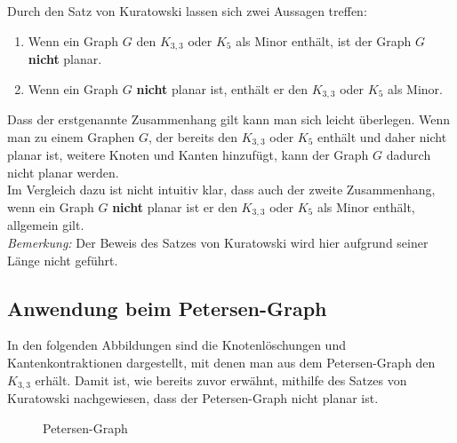 \documentclass[a4paper]{article}
\begin{document}
Durch den Satz von Kuratowski lassen sich zwei Aussagen treffen:

\begin{enumerate}
    \item Wenn ein Graph $G$ den $K_{3,3}$ oder $K_5$ als Minor enthält, ist der Graph $G$ \textbf{nicht} planar.
    \item Wenn ein Graph $G$ \textbf{nicht} planar ist, enthält er den $K_{3,3}$ oder $K_5$ als Minor.
\end{enumerate}

Dass der erstgenannte Zusammenhang gilt kann man sich leicht überlegen.
Wenn man zu einem Graphen $G$, der bereits den $K_{3,3}$ oder $K_5$ enthält und daher nicht planar ist, weitere Knoten und Kanten hinzufügt, kann der Graph $G$ dadurch nicht planar werden.\\

Im Vergleich dazu ist nicht intuitiv klar, dass auch der zweite Zusammenhang, wenn ein Graph $G$ \textbf{nicht} planar ist er den $K_{3,3}$ oder $K_5$ als Minor enthält, allgemein gilt.\\

\textit{Bemerkung:} Der Beweis des Satzes von Kuratowski wird hier aufgrund seiner Länge nicht geführt.


\subsection{Anwendung beim Petersen-Graph}
In den folgenden Abbildungen sind die Knotenlöschungen und Kantenkontraktionen dargestellt, mit denen man aus dem Petersen-Graph den $K_{3,3}$ erhält.
Damit ist, wie bereits zuvor erwähnt, mithilfe des Satzes von Kuratowski nachgewiesen, dass der Petersen-Graph nicht planar ist.

\begin{figure}[H]
    \centering
    \caption{Petersen-Graph}
    \label{fig:my_label}
\end{figure}
\end{document}
